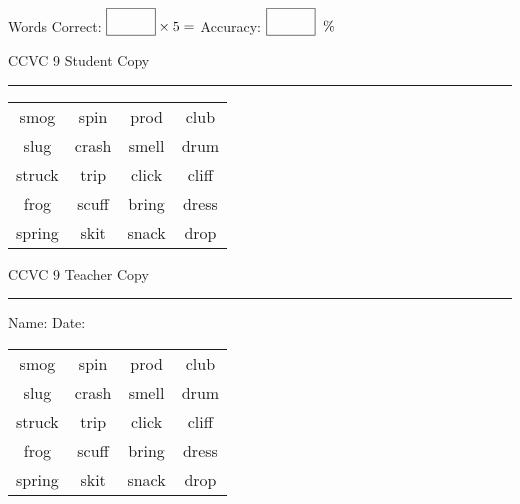\documentclass{memoir}
\begin{document}
\small

Words Correct: $\fbox{\phantom{\huge 100}} \times 5 = $ Accuracy: $\fbox{\phantom{\huge 100}}\;\; \%$ 

\vfill

\newpage


\footnotesize \noindent
CCVC 9 \hfill Student Copy
\smallskip
\hrule

\Large

\setlength{\tabcolsep}{14pt}
\def\arraystretch{3}

{\selectfont


\begin{vplace}[0.5]
\begin{center}
\begin{tabular}{cccc}
smog & spin & prod & club \\
slug & crash & smell & drum \\
struck & trip & click             & cliff            \\
frog & scuff & bring      & dress \\
spring & skit & snack & drop \\
\end{tabular}
\end{center}
\end{vplace}

}

\newpage

\footnotesize \noindent
CCVC 9 \hfill Teacher Copy
\smallskip
\hrule

\small

\vfill

\noindent
Name: \underline{\hspace{1.75in}} \hfill Date: \underline{\hspace{1in}}

\Large

{\selectfont


\begin{vplace}[0.5]
\begin{center}
\begin{tabular}{cccc}
smog & spin & prod & club \\
slug & crash & smell & drum \\
struck & trip & click             & cliff            \\
frog & scuff & bring      & dress \\
spring & skit & snack & drop \\
\end{tabular}
\end{center}
\end{vplace}



}
\end{document}
